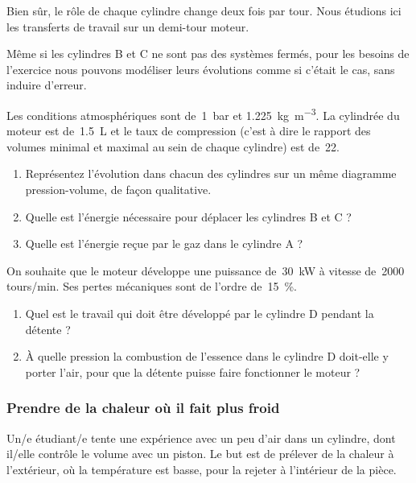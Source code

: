 		Bien sûr, le rôle de chaque cylindre change deux fois par tour. Nous étudions ici les transferts de travail sur un demi-tour moteur.

		Même si les cylindres B et C ne sont pas des systèmes fermés, pour les besoins de l’exercice nous pouvons modéliser leurs évolutions comme si c’était le cas, sans induire d’erreur.

		Les conditions atmosphériques sont de~\SI{1}{\bar} et \SI{1,225}{\kilogram\per\metre\cubed}.	La cylindrée du moteur est de~\SI{1,5}{\liter} et le taux de compression (c’est à dire le rapport des volumes minimal et maximal au sein de chaque cylindre) est de~\num{22}. 
		
		\begin{enumerate}
			\item Représentez l’évolution dans chacun des cylindres sur un même diagramme pression-volume, de façon qualitative.
			\item Quelle est l’énergie nécessaire pour déplacer les cylindres B et C ?
			\item Quelle est l’énergie reçue par le gaz dans le cylindre A ?
		\end{enumerate}
		
		On souhaite que le moteur développe une puissance de~\SI{30}{\kilo\watt} à vitesse de~\num{2000} \si{tours/min}. Ses pertes mécaniques sont de l’ordre de~\SI{15}{\percent}.
		
		\begin{enumerate}
			\item Quel est le travail qui doit être développé par le cylindre D pendant la détente ?
			\item À quelle pression la combustion de l’essence dans le cylindre D doit-elle y porter l’air, pour que la détente puisse faire fonctionner le moteur ?
		\end{enumerate}



\subsubsection{Prendre de la chaleur où il fait plus froid}
\label{exo_prendre_de_la_chaleur}

	Un/e étudiant/e tente une expérience avec un peu d’air dans un cylindre, dont il/elle contrôle le volume avec un piston. Le but est de prélever de la chaleur à l’extérieur, où la température est basse, pour la rejeter à l’intérieur de la pièce.

